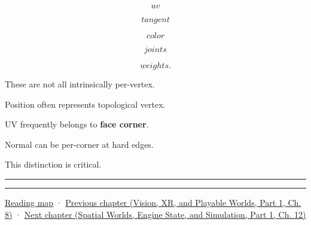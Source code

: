 \[
uv
\]

\[
tangent
\]

\[
color
\]

\[
joints
\]

\[
weights.
\]

These are not all intrinsically per-vertex.

Position often represents topological vertex.

UV frequently belongs to \textbf{face corner}.

Normal can be per-corner at hard edges.

This distinction is critical.

\begin{center}\rule{0.5\linewidth}{0.5pt}\end{center}

\begin{center}\rule{0.5\linewidth}{0.5pt}\end{center}

\hyperref[volume-reading-map]{Reading map} · \href{../07-Vision-XR-and-Playable-Worlds-P01/main.pdf\#nameddest=04-visual-computing-ii-ch039-tiling-ordering-and-compositing-at-scale}{Previous chapter (Vision, XR, and Playable Worlds, Part 1, Ch. 8)} · \href{../05-Spatial-Worlds-Engine-State-and-Simulation-P01/main.pdf\#nameddest=04-visual-computing-ii-ch041-per-vertex-and-per-corner-mesh-attributes}{Next chapter (Spatial Worlds, Engine State, and Simulation, Part 1, Ch. 12)}
